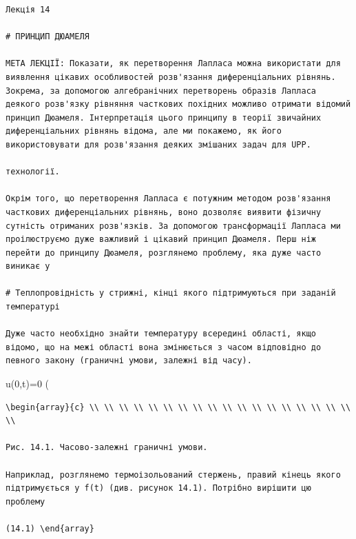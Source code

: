 \documentclass[
  ukrainian,
]{article}
\begin{document}
\begin{verbatim}
Лекція 14

# ПРИНЦИП ДЮАМЕЛЯ

МЕТА ЛЕКЦІЇ: Показати, як перетворення Лапласа можна використати для виявлення цікавих особливостей розв'язання диференціальних рівнянь. Зокрема, за допомогою алгебранічних перетворень образів Лапласа деякого розв'язку рівняння часткових похідних можливо отримати відомий принцип Дюамеля. Інтерпретація цього принципу в теорії звичайних диференціальних рівнянь відома, але ми покажемо, як його використовувати для розв'язання деяких змішаних задач для UPP.

технології.

Окрім того, що перетворення Лапласа є потужним методом розв'язання часткових диференціальних рівнянь, воно дозволяє виявити фізичну сутність отриманих розв'язків. За допомогою трансформації Лапласа ми проілюструємо дуже важливий і цікавий принцип Дюамеля. Перш ніж перейти до принципу Дюамеля, розглянемо проблему, яка дуже часто виникає у

# Теплопровідність у стрижні, кінці якого підтримуються при заданій температурі

Дуже часто необхідно знайти температуру всередині області, якщо відомо, що на межі області вона змінюється з часом відповідно до певного закону (граничні умови, залежні від часу).
\end{verbatim}

u(0,t)=0 \left(

\begin{verbatim}
\begin{array}{c} \\ \\ \\ \\ \\ \\ \\ \\ \\ \\ \\ \\ \\ \\ \\ \\ \\ \\ \\

Рис. 14.1. Часово-залежні граничні умови.

Наприклад, розглянемо термоізольований стержень, правий кінець якого підтримується у f(t) (див. рисунок 14.1). Потрібно вирішити цю проблему

(14.1) \end{array}
\end{verbatim}
\end{document}
